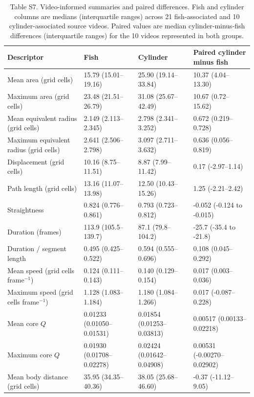 \documentclass[11pt,a4paper]{article}
\begin{document}
\begin{landscape}
\begin{table}[p]
\centering
\caption*{Table S7. Video-informed summaries and paired differences. Fish and cylinder columns are medians (interquartile ranges) across 21 fish-associated and 10 cylinder-associated source videos. Paired values are median cylinder-minus-fish differences (interquartile ranges) for the 10 videos represented in both groups.}
\small
\begin{tabular}{llll}
\toprule
Descriptor & Fish & Cylinder & Paired cylinder minus fish \\
\midrule
Mean area (grid cells) & 15.79 (15.01--19.16) & 25.90 (19.14--33.84) & 10.37 (4.04--13.30) \\
Maximum area (grid cells) & 23.48 (21.51--26.79) & 31.08 (25.67--42.49) & 10.67 (0.72--15.62) \\
Mean equivalent radius (grid cells) & 2.149 (2.113--2.345) & 2.798 (2.341--3.252) & 0.672 (0.219--0.728) \\
Maximum equivalent radius (grid cells) & 2.641 (2.506--2.798) & 3.097 (2.711--3.632) & 0.636 (0.056--0.819) \\
Displacement (grid cells) & 10.16 (8.75--11.51) & 8.87 (7.99--11.42) & 0.17 (-2.97--1.14) \\
Path length (grid cells) & 13.16 (11.07--13.98) & 12.50 (10.43--15.26) & 1.25 (-2.21--2.42) \\
Straightness & 0.824 (0.776--0.861) & 0.793 (0.723--0.812) & -0.052 (-0.124 to -0.015) \\
Duration (frames) & 113.9 (105.5--139.7) & 87.1 (79.8--104.2) & -25.7 (-35.4 to -21.8) \\
Duration / segment length & 0.495 (0.425--0.522) & 0.594 (0.555--0.696) & 0.108 (0.045--0.292) \\
Mean speed (grid cells frame$^{-1}$) & 0.124 (0.111--0.143) & 0.140 (0.129--0.154) & 0.017 (0.003--0.036) \\
Maximum speed (grid cells frame$^{-1}$) & 1.128 (1.083--1.184) & 1.180 (1.084--1.266) & 0.017 (-0.087--0.228) \\
Mean core $Q$ & 0.01233 (0.01050--0.01531) & 0.01854 (0.01253--0.03813) & 0.00517 (0.00133--0.02218) \\
Maximum core $Q$ & 0.01930 (0.01708--0.02278) & 0.02424 (0.01642--0.04908) & 0.00531 (-0.00270--0.02902) \\
Mean body distance (grid cells) & 35.95 (34.35--40.36) & 38.05 (25.68--46.60) & -0.37 (-11.12--9.05) \\

\end{tabular}
\end{table}
\end{landscape}
\end{document}
